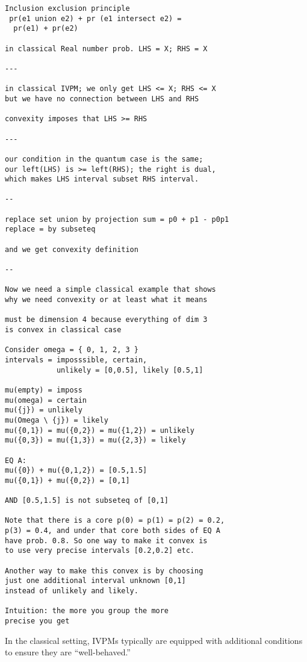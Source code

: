 \documentclass[english,reprint, aps, prl,superscriptaddress, showpacs,
showkeys, longbibliography, amsmath, amssymb]{revtex4-1}
\theoremstyle{plain}
\theoremstyle{definition}
\begin{document}
\begin{verbatim}
Inclusion exclusion principle 
 pr(e1 union e2) + pr (e1 intersect e2) = 
  pr(e1) + pr(e2)

in classical Real number prob. LHS = X; RHS = X

---

in classical IVPM; we only get LHS <= X; RHS <= X
but we have no connection between LHS and RHS

convexity imposes that LHS >= RHS

---

our condition in the quantum case is the same; 
our left(LHS) is >= left(RHS); the right is dual, 
which makes LHS interval subset RHS interval.

--

replace set union by projection sum = p0 + p1 - p0p1
replace = by subseteq

and we get convexity definition

-- 

Now we need a simple classical example that shows 
why we need convexity or at least what it means

must be dimension 4 because everything of dim 3 
is convex in classical case

Consider omega = { 0, 1, 2, 3 }
intervals = imposssible, certain, 
            unlikely = [0,0.5], likely [0.5,1] 

mu(empty) = imposs
mu(omega) = certain
mu({j}) = unlikely
mu(Omega \ {j}) = likely
mu({0,1}) = mu({0,2}) = mu({1,2}) = unlikely
mu({0,3}) = mu({1,3}) = mu({2,3}) = likely

EQ A:
mu({0}) + mu({0,1,2}) = [0.5,1.5]
mu({0,1}) + mu({0,2}) = [0,1]

AND [0.5,1.5] is not subseteq of [0,1]

Note that there is a core p(0) = p(1) = p(2) = 0.2, 
p(3) = 0.4, and under that core both sides of EQ A 
have prob. 0.8. So one way to make it convex is 
to use very precise intervals [0.2,0.2] etc. 

Another way to make this convex is by choosing 
just one additional interval unknown [0,1] 
instead of unlikely and likely.

Intuition: the more you group the more 
precise you get

\end{verbatim}

In the classical setting, IVPMs typically are equipped with additional
conditions to ensure they are ``well-behaved.''
\end{document}
